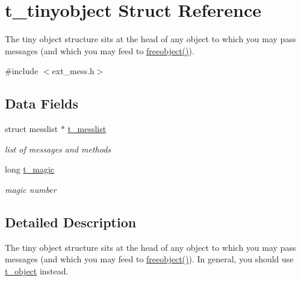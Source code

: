\hypertarget{structt__tinyobject}{
\section{t\_\-tinyobject Struct Reference}
\label{structt__tinyobject}
}


The tiny object structure sits at the head of any object to which you may pass messages (and which you may feed to \hyperlink{group__class__old_gadf30646e52376a37b93cc20efac65636}{freeobject()}).  


{\ttfamily \#include $<$ext\_\-mess.h$>$}\subsection*{Data Fields}
\begin{DoxyCompactItemize}
\item 
\hypertarget{structt__tinyobject_a9c84a65d0f833bca63712f335d6305fd}{
struct messlist $\ast$ \hyperlink{structt__tinyobject_a9c84a65d0f833bca63712f335d6305fd}{t\_\-messlist}}
\label{structt__tinyobject_a9c84a65d0f833bca63712f335d6305fd}

\begin{DoxyCompactList}\small\item\em list of messages and methods \item\end{DoxyCompactList}\item 
\hypertarget{structt__tinyobject_ac512106b41d8eb500619b66e5dc001d3}{
long \hyperlink{structt__tinyobject_ac512106b41d8eb500619b66e5dc001d3}{t\_\-magic}}
\label{structt__tinyobject_ac512106b41d8eb500619b66e5dc001d3}

\begin{DoxyCompactList}\small\item\em magic number \item\end{DoxyCompactList}\end{DoxyCompactItemize}


\subsection{Detailed Description}
The tiny object structure sits at the head of any object to which you may pass messages (and which you may feed to \hyperlink{group__class__old_gadf30646e52376a37b93cc20efac65636}{freeobject()}). In general, you should use \hyperlink{structt__object}{t\_\-object} instead. 